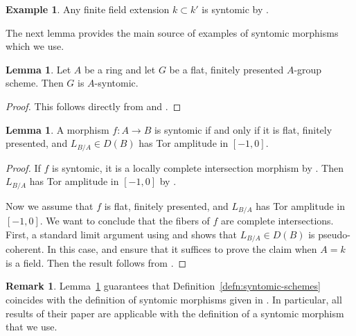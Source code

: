 \documentclass[11pt,reqno]{amsart}
\numberwithin{equation}{section}
\theoremstyle{definition}
\newtheorem{lemma}[thm]{Lemma}
\newtheorem{rmk}[thm]{Remark}
\newtheorem{example}[thm]{Example}
\begin{document}
\begin{example}\label{ex:finite-field-extension-syntomic} Any finite field extension $k\subset k'$ is syntomic by \cite[\href{https://stacks.math.columbia.edu/tag/00SF}{Tag 00SF}]{stacks-project}.
\end{example}

The next lemma provides the main source of examples of syntomic morphisms which we use.

\begin{lemma}\label{lemma:finite-flat-groups-syntomic} Let $A$ be a ring and let $G$ be a flat, finitely presented $A$-group scheme. Then $G$ is $A$-syntomic.
\end{lemma}
\begin{proof}
    This follows directly from \cite[\href{https://stacks.math.columbia.edu/tag/00SJ}{Tag 00SJ}]{stacks-project} and \cite[Exp.\ VII\textsubscript{B}, Cor.\ 5.5.1]{SGA3}.
\end{proof}

\begin{lemma}\label{lemma:syntomic-cotangent-complex} A morphism $f\colon A \to B$ is syntomic if and only if it is flat, finitely presented, and $L_{B/A}\in D(B)$ has Tor amplitude in $[-1, 0]$.
\end{lemma}

\begin{proof}
    If $f$ is syntomic, it is a locally complete intersection morphism by \cite[\href{https://stacks.math.columbia.edu/tag/069K}{Tag 069K}]{stacks-project}. Then $L_{B/A}$ has Tor amplitude in $[-1, 0]$ by \cite[\href{https://stacks.math.columbia.edu/tag/08SL}{Tag 08SL}]{stacks-project}. \smallskip

    Now we assume that $f$ is flat, finitely presented, and $L_{B/A}$ has Tor amplitude in $[-1, 0]$. We want to conclude that the fibers of $f$ are complete intersections. First, a standard limit argument using \cite[\href{https://stacks.math.columbia.edu/tag/08QQ}{Tag 08QQ}]{stacks-project} and \cite[Prop.~4.12]{Quillen} shows that $L_{B/A}\in D(B)$ is pseudo-coherent. In this case, \cite[\href{https://stacks.math.columbia.edu/tag/068V}{Tag 068V}]{stacks-project} and \cite[\href{https://stacks.math.columbia.edu/tag/08QQ}{Tag 08QQ}]{stacks-project} ensure that it suffices to prove the claim when $A=k$ is a field. Then the result follows from \cite[(1.2) Second Vanishing Theorem]{Avramov}.
\end{proof}

\begin{rmk} Lemma~\ref{lemma:syntomic-cotangent-complex} guarantees that Definition~\ref{defn:syntomic-schemes} coincides with the definition of syntomic morphisms given in \cite[Notation 2.1]{ABM}. In particular, all results of their paper are applicable with the definition of a syntomic morphism that we use.
\end{rmk}
\end{document}
